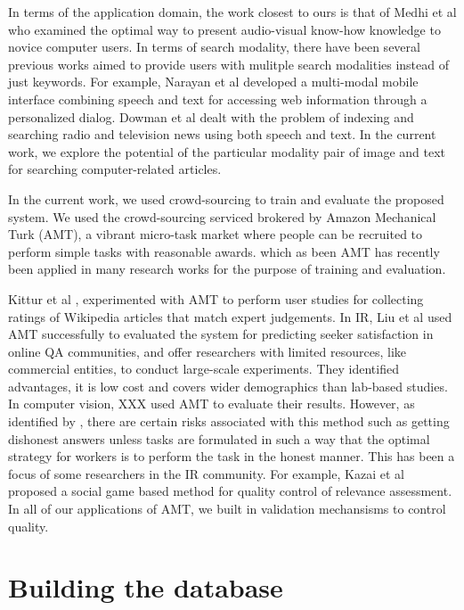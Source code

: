 \documentclass{www2010-submission}
\begin{document}
In terms of the application domain, the work closest to ours is that
of Medhi et al \cite{Medhi} who examined the optimal way to present
audio-visual know-how knowledge to novice computer users.  In terms of
search modality, there have been several previous works aimed to
provide users with mulitple search modalities instead of just
keywords. For example, Narayan et al \cite{Narayan} developed a
multi-modal mobile interface combining speech and text for accessing
web information through a personalized dialog.  Dowman et al
\cite{Dowman} dealt with the problem of indexing and searching radio
and television news using both speech and text. In the current work,
we explore the potential of the particular modality pair of image and
text for searching computer-related articles.


In the current work, we used crowd-sourcing to train
and evaluate the proposed system. 
We used the crowd-sourcing serviced brokered by 
Amazon Mechanical Turk (AMT), a vibrant micro-task
market where people can be recruited to perform
simple tasks with reasonable awards.
which as been 
AMT has recently been applied in many research works
for the purpose of training and evaluation. 

Kittur et al \cite{Kittur},
experimented with AMT
to perform user studies for collecting ratings of Wikipedia articles
that match expert judgements.  In IR, Liu et al \cite{Liu} used AMT
successfully to evaluated the system for predicting seeker
satisfaction in online QA communities, and offer researchers with
limited resources, like commercial entities, to conduct large-scale
experiments.  They identified advantages, it is low cost and covers wider
demographics than lab-based studies.  In computer vision, XXX used AMT
to evaluate their results. However, as identified by \cite{Liu}, there
are certain risks associated with this method such as getting
dishonest answers unless tasks are formulated in such a way that the
optimal strategy for workers is to perform the task in the honest
manner. This has been a focus of some researchers in the IR
community. For example, Kazai et al \cite{Kazai} proposed a social
game based method for quality control of relevance assessment. In
all of our applications of AMT, we built in validation 
mechansisms to control quality.

\section{Building the database}
\end{document}
